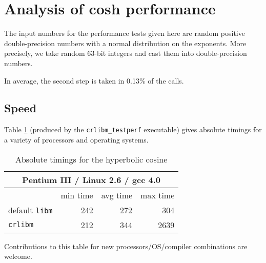 \section{Analysis of cosh performance}
\label{section:cosh_results}
The input numbers for the performance tests given here are random
positive double-precision numbers with a normal distribution on the
exponents. More precisely, we take random 63-bit integers and cast
them into double-precision numbers.  


In average, the second step is taken in 0.13\% of the calls.


\subsection{Speed}
Table \ref{tbl:cosh_abstime} (produced by the \texttt{crlibm\_testperf}
executable) gives absolute timings for a variety of processors and
operating systems.  

\begin{table}[!htb]
\begin{center}
\renewcommand{\arraystretch}{1.2}
\begin{tabular}{|l|r|r|r|}
\hline
 \multicolumn{4}{|c|}{Pentium III / Linux 2.6 / gcc 4.0}   \\ 
 \hline
 \hline
                             & min time          & avg time     & max time        \\ 
 \hline
 default \texttt{libm}          & 242           &        272    & 304      \\ 
 \hline
 \texttt{crlibm}                & 212           &        344    & 2639      \\ 
 \hline
 \hline
\end{tabular}
\end{center}
\caption{Absolute timings for the hyperbolic cosine
  \label{tbl:cosh_abstime}}
\end{table}

Contributions to this table for new processors/OS/compiler combinations are welcome.




